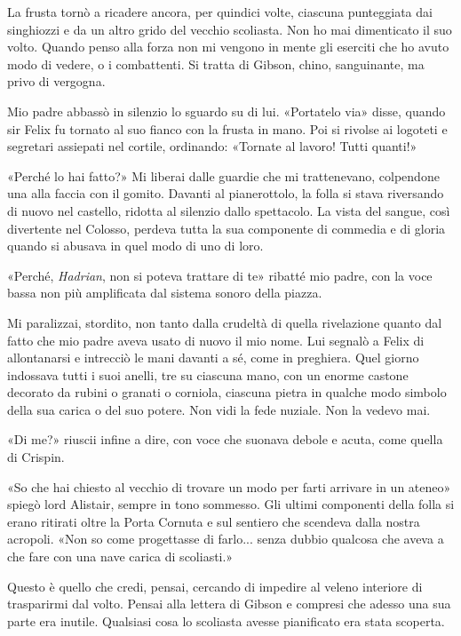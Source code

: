 La frusta tornò a ricadere ancora, per quindici volte, ciascuna
punteggiata dai singhiozzi e da un altro grido del vecchio scoliasta.
Non ho mai dimenticato il suo volto. Quando penso alla forza non mi
vengono in mente gli eserciti che ho avuto modo di vedere, o i
combattenti. Si tratta di Gibson, chino, sanguinante, ma privo di
vergogna.

Mio padre abbassò in silenzio lo sguardo su di lui. «Portatelo via»
disse, quando sir Felix fu tornato al suo fianco con la frusta in mano.
Poi si rivolse ai logoteti e segretari assiepati nel cortile, ordinando:
«Tornate al lavoro! Tutti quanti!»

«Perché lo hai fatto?» Mi liberai dalle guardie che mi trattenevano,
colpendone una alla faccia con il gomito. Davanti al pianerottolo, la
folla si stava riversando di nuovo nel castello, ridotta al silenzio
dallo spettacolo. La vista del sangue, così divertente nel Colosso,
perdeva tutta la sua componente di commedia e di gloria quando si
abusava in quel modo di uno di loro.

«Perché, \emph{Hadrian}, non si poteva trattare di te» ribatté mio
padre, con la voce bassa non più amplificata dal sistema sonoro della
piazza.

Mi paralizzai, stordito, non tanto dalla crudeltà di quella rivelazione
quanto dal fatto che mio padre aveva usato di nuovo il mio nome. Lui
segnalò a Felix di allontanarsi e intrecciò le mani davanti a sé, come
in preghiera. Quel giorno indossava tutti i suoi anelli, tre su ciascuna
mano, con un enorme castone decorato da rubini o granati o corniola,
ciascuna pietra in qualche modo simbolo della sua carica o del suo
potere. Non vidi la fede nuziale. Non la vedevo mai.

«Di me?» riuscii infine a dire, con voce che suonava debole e acuta,
come quella di Crispin.

«So che hai chiesto al vecchio di trovare un modo per farti arrivare in
un ateneo» spiegò lord Alistair, sempre in tono sommesso. Gli ultimi
componenti della folla si erano ritirati oltre la Porta Cornuta e sul
sentiero che scendeva dalla nostra acropoli. «Non so come progettasse di
farlo... senza dubbio qualcosa che aveva a che fare con una nave carica
di scoliasti.»

Questo è quello che credi, pensai, cercando di impedire al veleno
interiore di trasparirmi dal volto. Pensai alla lettera di Gibson e
compresi che adesso una sua parte era inutile. Qualsiasi cosa lo
scoliasta avesse pianificato era stata scoperta.

